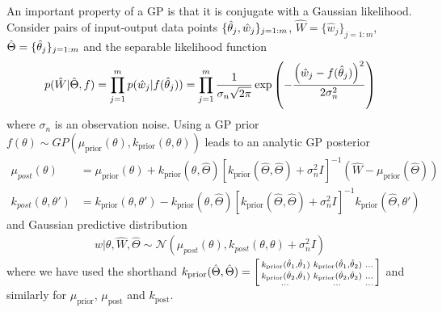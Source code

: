 An important property of a GP is that it is conjugate with a Gaussian likelihood.  Consider pairs of input-output data points $\{\hat{\theta}_j,\hat{w}_j\}_{j=1:m}$, $\hat{W} = \{\hat{w}_j\}_{j=1:m}$, $\hat{\Theta} = \{\hat{\theta}_j\}_{j=1:m}$ and the separable likelihood function
\begin{align}
\label{eq:GP-lik}
p(\hat{W}| \hat{\Theta}, f) = \prod_{j=1}^{m}p(\hat{w}_j | f(\hat{\theta}_j)) = \prod_{j=1}^{m}\frac{1}{\sigma_{n}\sqrt{2\pi}} \exp \left(-\frac{\left(\hat{w}_j-f(\hat{\theta}_j)\right)^2}{2\sigma_n^2}\right)
\end{align}
where $\sigma_n$ is an observation noise. Using a GP prior $f\left(\theta\right)\sim GP(\mu_{\text{prior}}\left(\theta\right),k_{\text{prior}}\left(\theta,\theta\right))$ leads to an analytic GP posterior 
\begin{align}
\label{eq:gpPosterior}
\mu_{post} \left(\theta\right) & = \mu_{\text{prior}}\left(\theta\right) + k_{\text{prior}}\left(\theta,\hat{\Theta} \right) \left[k_{\text{prior}}\left(\hat{\Theta} ,\hat{\Theta}  \right) + \sigma_n^2 I\right]^{-1} \left(\hat{W} -\mu_{\text{prior}}\left(\hat{\Theta} \right)\right) \\
k_{post} \left(\theta,\theta'\right) & = k_{\text{prior}} \left(\theta,\theta'\right) - k_{\text{prior}}\left(\theta,\hat{\Theta} \right) \left[k_{\text{prior}}\left(\hat{\Theta},\hat{\Theta} \right) + \sigma_n^2 I\right]^{-1} k_{\text{prior}}\left(\hat{\Theta} ,\theta'\right)
\end{align}
and Gaussian predictive distribution
\begin{align}
\label{eq:gpPred}
w | \theta, \hat{W}, \hat{\Theta} \sim \mathcal{N} \left(\mu_{post}\left(\theta\right), k_{post} \left(\theta,\theta\right) + \sigma_n^2 I\right)
\end{align}
where we have used the shorthand $k_{\text{prior}}(\hat{\Theta},\hat{\Theta}) = \left[\begin{smallmatrix} k_{\text{prior}}(\hat{\theta}_1,\hat{\theta}_1) & k_{\text{prior}}(\hat{\theta}_1,\hat{\theta}_2) & \dots\\ k_{\text{prior}}(\hat{\theta}_2,\hat{\theta}_1) & k_{\text{prior}}(\hat{\theta}_2,\hat{\theta}_2) & \dots \\ \dots & \dots & \dots\end{smallmatrix}\right]$ and similarly for $\mu_{\text{prior}}$, $\mu_{\text{post}}$ and $k_{\text{post}}$.
